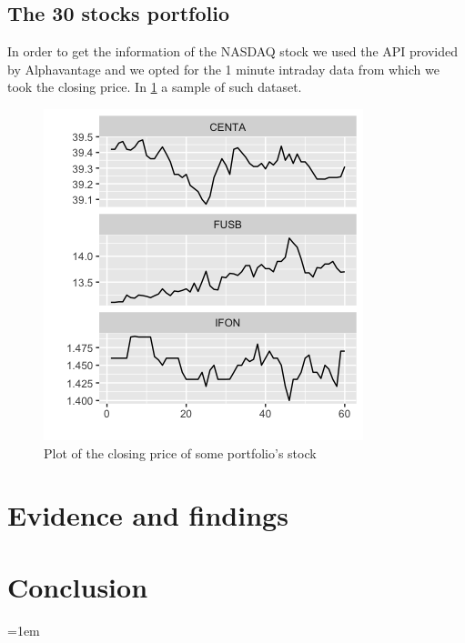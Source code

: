 \documentclass[twocolumn]{article}
\begin{document}
\subsection{The 30 stocks portfolio}
In order to get the information of the NASDAQ stock we used the API provided by Alphavantage \cite{_alpha_} and we opted for the 1 minute intraday data from which we took the closing price. In \ref{portfolio} a sample of such dataset.


\begin{figure}
    \centering
    \includegraphics[width=1\linewidth, ]{Paper/images/Rplot.png}
    \caption{Plot of the closing price of some portfolio's stock}
    \label{portfolio}
\end{figure}

\section{Evidence and findings}

\section{Conclusion}

\newpage
\emergencystretch=1em
\sloppy
\printbibliography
\end{document}
